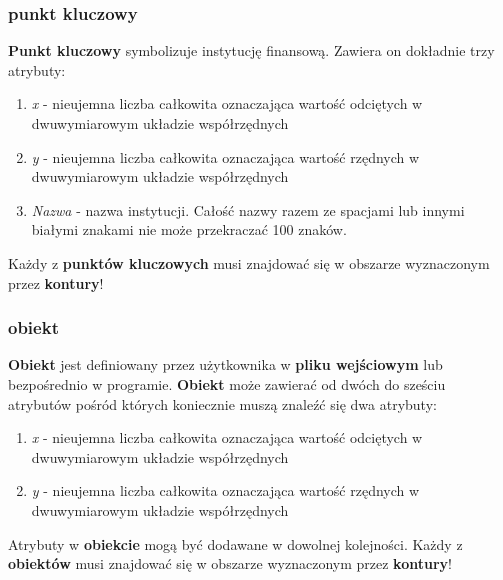 \documentclass[hidelinks,10pt,a4paper]{article}
\begin{document}
\subsubsection{punkt kluczowy}
\textbf{Punkt kluczowy} symbolizuje instytucję finansową. 
Zawiera on dokładnie trzy atrybuty:
\begin{enumerate}
\item \textit{x} - nieujemna liczba całkowita oznaczająca wartość odciętych w dwuwymiarowym układzie współrzędnych
\item \textit{y} - nieujemna liczba całkowita oznaczająca wartość rzędnych w dwuwymiarowym układzie współrzędnych
\item \textit{Nazwa} - nazwa instytucji. Całość nazwy razem ze spacjami lub innymi białymi znakami nie może przekraczać 100 znaków. 
\end{enumerate}
Każdy z \textbf{punktów kluczowych} musi znajdować się w obszarze wyznaczonym przez \textbf{kontury}!

\subsubsection{obiekt}
\textbf{Obiekt} jest definiowany przez użytkownika w \textbf{pliku wejściowym} lub bezpośrednio w programie. 
\textbf{Obiekt} może zawierać od dwóch do sześciu atrybutów pośród których koniecznie muszą znaleźć się dwa atrybuty:
\begin{enumerate}
\item \textit{x} - nieujemna liczba całkowita oznaczająca wartość odciętych w dwuwymiarowym układzie współrzędnych
\item \textit{y} - nieujemna liczba całkowita oznaczająca wartość rzędnych w dwuwymiarowym układzie współrzędnych
\end{enumerate}
Atrybuty w \textbf{obiekcie} mogą być dodawane w dowolnej kolejności.
Każdy z \textbf{obiektów} musi znajdować się w obszarze wyznaczonym przez \textbf{kontury}!
\end{document}
